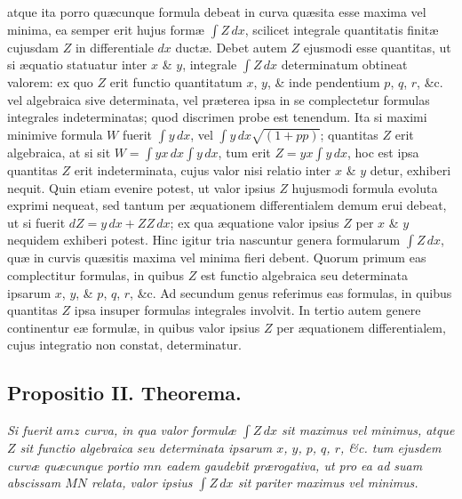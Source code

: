 atque ita porro quæcunque formula debeat in curva quæsita esse maxima vel minima, ea semper erit hujus formæ $\int Z\,dx$, scilicet integrale quantitatis finitæ cujusdam $Z$ in differentiale $dx$ ductæ. Debet autem $Z$ ejusmodi esse quantitas, ut si æquatio statuatur inter $x$ \& $y$, integrale $\int Z\,dx$ determinatum obtineat valorem: ex quo $Z$ erit functio quantitatum $x$, $y$, \& inde pendentium $p$, $q$, $r$, \&c. vel algebraica sive determinata, vel præterea ipsa in se complectetur formulas integrales indeterminatas; quod discrimen probe est tenendum. Ita si maximi minimive formula $W$ fuerit $\int y\,dx$, vel $\int y\,dx\sqrt{(1+pp)}$; quantitas $Z$ erit algebraica, at si sit $W=\int yx\,dx\int y\,dx$, tum erit $Z=yx\int y\,dx$, hoc est ipsa quantitas $Z$ erit indeterminata, cujus valor nisi relatio inter $x$ \& $y$ detur, exhiberi nequit. Quin etiam evenire potest, ut valor ipsius $Z$ hujusmodi formula evoluta exprimi nequeat, sed tantum per æquationem differentialem demum erui debeat, ut si fuerit $dZ=y\,dx+ZZ\,dx$; ex qua æquatione valor ipsius $Z$ per $x$ \& $y$ nequidem exhiberi potest. Hinc igitur tria nascuntur genera formularum $\int Z\,dx$, quæ in curvis quæsitis maxima vel minima fieri debent. Quorum primum eas complectitur formulas, in quibus $Z$ est functio algebraica seu determinata ipsarum $x$, $y$, \& $p$, $q$, $r$, \&c. Ad secundum genus referimus eas formulas, in quibus quantitas $Z$ ipsa insuper formulas integrales involvit. In tertio autem genere continentur eæ formulæ, in quibus valor ipsius $Z$ per æquationem differentialem, cujus integratio non constat, determinatur.

\subsection*{Propositio II. Theorema.}
\textit{Si fuerit $amz$ curva, in qua valor formulæ $\int Z\,dx$ sit maximus vel minimus, atque $Z$ sit functio algebraica seu determinata ipsarum $x$, $y$, $p$, $q$, $r$, \&c. tum ejusdem curvæ quæcunque portio $mn$ eadem gaudebit prærogativa, ut pro ea ad suam abscissam $MN$ relata, valor ipsius $\int Z\,dx$ sit pariter maximus vel minimus.}

